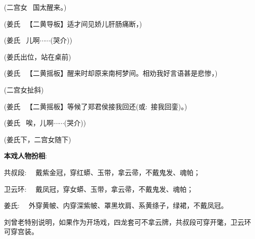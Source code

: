 (二宫女\hspace{15pt}~ 国太醒来。)

(姜氏\hspace{20pt}~ 【{\akai 二黄导板}】适才间见娇儿肝肠痛断，)

(姜氏\hspace{20pt}~ 儿啊$\cdots${}$\cdots{}$({\hwfs 哭介}))

(姜氏{\hwfs 出位}，{\hwfs 站在桌前})

(姜氏\hspace{20pt}~ 【{\akai 二黄摇板}】醒来时却原来南柯梦间。相劝我好言语甚是悲惨，)

({\hwfs 二}宫女{\hwfs 扯斜})

(姜氏\hspace{20pt}~ 【{\akai 二黄摇板}】等候了郑君侯接我回还({\akai 或}:~接我回銮)。)

(姜氏\hspace{20pt}~ 唉，儿啊$\cdots${}$\cdots{}$({\hwfs 哭介}))

(姜氏{\hwfs 下}，{\hwfs 二}宫女{\hwfs 随下})

\vspace{25pt}
{\bfseries\textrm{本戏人物扮相}}:~
\vspace{15pt}

共叔段:~\hspace{20pt}~ 戴紫金冠，穿红蟒、玉带，拿云帚，不戴鬼发、魂帕；

卫云环:~\hspace{20pt}~  戴凤冠，穿女蟒、玉带，拿云帚，不戴鬼发、魂帕；

姜氏:~\hspace{30pt}~ 外穿黄帔、内穿深紫帔、罩黑坎肩、系黄绦子，绿裙，不戴凤冠。

\vspace{15pt}
刘曾老特别说明，如果作为开场戏，四龙套可不拿云牌，共叔段可穿开氅，卫云环可穿宫装。

